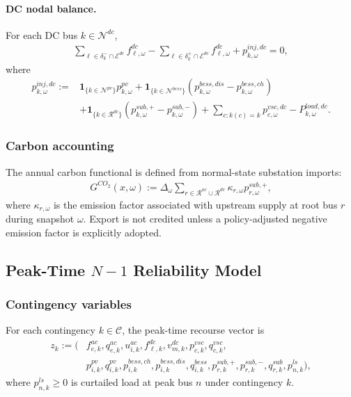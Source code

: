 \paragraph{DC nodal balance.}
For each DC bus \(k\in\mathcal{N}^{dc}\),
\begin{align}
\sum_{\ell\in\delta_k^{-}\cap\mathcal{E}^{dc}} f_{\ell,\omega}^{dc}
- \sum_{\ell\in\delta_k^{+}\cap\mathcal{E}^{dc}} f_{\ell,\omega}^{dc}
+ p_{k,\omega}^{inj,dc} = 0,
\label{eq:10b-dc-balance}
\end{align}
where
\begin{align}
p_{k,\omega}^{inj,dc} :=
&\mathbf{1}_{\{k\in\mathcal{N}^{pv}\}}p_{k,\omega}^{pv}
+ \mathbf{1}_{\{k\in\mathcal{N}^{bess}\}}\left(p_{k,\omega}^{bess,dis}-p_{k,\omega}^{bess,ch}\right) \\
&+ \mathbf{1}_{\{k\in\mathcal{R}^{dc}\}}\left(p_{k,\omega}^{sub,+}-p_{k,\omega}^{sub,-}\right)
+ \sum_{c:k(c)=k} p_{c,\omega}^{vsc,dc}
- P_{k,\omega}^{load,dc}.
\label{eq:10b-dc-net-injection}
\end{align}

\subsubsection{Carbon accounting}

The annual carbon functional is defined from normal-state substation imports:
\begin{align}
G^{CO_2}(x,\omega) :=
\Delta_\omega
\sum_{r\in\mathcal{R}^{ac}\cup\mathcal{R}^{dc}}
\kappa_{r,\omega} p_{r,\omega}^{sub,+},
\label{eq:10b-carbon-functional}
\end{align}
where \(\kappa_{r,\omega}\) is the emission factor associated with upstream supply at root bus \(r\) during snapshot \(\omega\). Export is not credited unless a policy-adjusted negative emission factor is explicitly adopted.

\subsection{Peak-Time \texorpdfstring{$N{-}1$}{N-1} Reliability Model}

\subsubsection{Contingency variables}

For each contingency \(k\in\mathcal{C}\), the peak-time recourse vector is
\begin{align}
z_k := \Big(
&f_{e,k}^{ac},q_{e,k}^{ac},u_{i,k}^{ac},
f_{\ell,k}^{dc},v_{m,k}^{dc},
p_{c,k}^{vsc},q_{c,k}^{vsc}, \\
&p_{i,k}^{pv},q_{i,k}^{pv},
p_{i,k}^{bess,ch},p_{i,k}^{bess,dis},q_{i,k}^{bess},
p_{r,k}^{sub,+},p_{r,k}^{sub,-},q_{r,k}^{sub},
p_{n,k}^{ls}
\Big),
\end{align}
where \(p_{n,k}^{ls}\ge 0\) is curtailed load at peak bus \(n\) under contingency \(k\).

